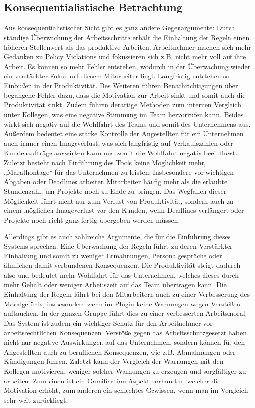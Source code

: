 \documentclass[a4paper,12pt,]{article}
\begin{document}
\subsection{Konsequentialistische Betrachtung}

Aus konsequentialistischer Sicht gibt es ganz andere Gegenargumente: Durch ständige Überwachung der Arbeitsschritte erhält die Einhaltung der Regeln einen höheren Stellenwert als das produktive Arbeiten. Arbeitnehmer machen sich mehr Gedanken zu Policy Violations und fokussieren sich z.B. nicht mehr voll auf ihre Arbeit. Es können so mehr Fehler entstehen, wodurch in der Überwachung wieder ein verstärkter Fokus auf diesem Mitarbeiter liegt. Langfristig entstehen so Einbußen in der Produktivität.
Des Weiteren führen Benachrichtigungen über begangene Fehler dazu, dass die Motivation zur Arbeit sinkt und somit auch die Produktivität sinkt. Zudem führen derartige Methoden zum internen Vergleich unter Kollegen, was eine negative Stimmung im Team hervorrufen kann. Beides wirkt sich negativ auf die Wohlfahrt des Teams und somit des Unternehmens aus.
Außerdem bedeutet eine starke Kontrolle der Angestellten für ein Unternehmen auch immer einen Imageverlust, was sich langfristig auf Verkaufszahlen oder Kundenaufträge auswirken kann und somit die Wohlfahrt negativ beeinflusst.
Zuletzt besteht nach Einführung des Tools keine Möglichkeit mehr, „Marathontage“ für das Unternehmen zu leisten: Insbesondere vor wichtigen Abgaben oder Deadlines arbeiten Mitarbeiter häufig mehr als die erlaubte Stundenzahl, um Projekte noch zu Ende zu bringen. Das Wegfallen dieser Möglichkeit führt nicht nur zum Verlust von Produktivität, sondern auch zu einem möglichen Imageverlust vor den Kunden, wenn Deadlines verlängert oder Projekte noch nicht ganz fertig übergeben werden müssen.

Allerdings gibt es auch zahlreiche Argumente, die für die Einführung dieses Systems sprechen: Eine Überwachung der Regeln führt zu deren Verstärkter Einhaltung und somit zu weniger Ermahnungen, Personalgespräche oder ähnlichen damit verbundenen Konsequenzen. Die Produktivität steigt dadurch also und bedeutet mehr Wohlfahrt für das Unternehmen, welches dieses durch mehr Gehalt oder weniger Arbeitszeit auf das Team übertragen kann.
Die Einhaltung der Regeln führt bei den Mitarbeitern auch zu einer Verbesserung des Moralgefühls, insbesondere wenn im Plugin keine Warnungen wegen Verstößen auftauchen. In der ganzen Gruppe führt dies zu einer verbesserten Arbeitsmoral.
Das System ist zudem ein wichtiger Schutz für den Arbeitnehmer vor arbeitsrechtlichen Konsequenzen. Verstöße gegen das Arbeitsschutzgesetzt haben nicht nur negative Auswirkungen auf das Unternehmen, sondern können für den Angestellten auch zu beruflichen Konsequenzen, wie z.B. Abmahnungen oder Kündigungen führen.
Zuletzt kann der Vergleich der Warnungen mit den Kollegen motivieren, weniger solcher Warnungen zu erzeugen und sorgfältiger zu arbeiten. Zum einen ist ein Gamification Aspekt vorhanden, welcher die Motivation erhöht, zum anderen ein schlechtes Gewissen, wenn man im Vergleich sehr weit zurückliegt.
\end{document}
